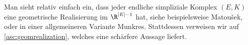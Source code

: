 Man sieht relativ einfach ein, dass jeder endliche simpliziale Komplex $(E,K)$ 
eine geometrische Realisierung im $\R^{\abs{E}-1}$ hat, siehe beispielsweise
Matou\v sek\cite[Ch.\,1,]{bookc:matousek03}, oder in einer allgemeineren
Variante Munkres\cite[Ch.\,1,\;\S3,]{bookc:munkres84}. Stattdessen
verweisen wir auf \cref{asc:geomrealization}, welches eine schärfere Aussage
liefert.



